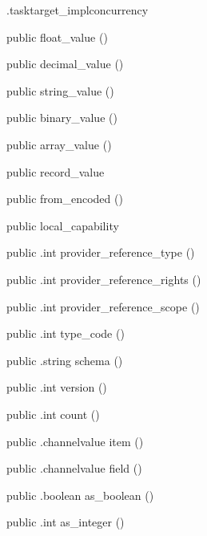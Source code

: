 \begin{CrexxClass}{.tasktarget\_impl}{concurrency}
\begin{Members}
    \Factory
      {public}
      {float\_value}
      {()}

    \Factory
      {public}
      {decimal\_value}
      {()}

    \Factory
      {public}
      {string\_value}
      {()}

    \Factory
      {public}
      {binary\_value}
      {()}

    \Factory
      {public}
      {array\_value}
      {()}

    \Factory
      {public}
      {record\_value}
      {}

    \Factory
      {public}
      {from\_encoded}
      {()}

    \Factory
      {public}
      {local\_capability}
      {}

    \Method
      {public}
      {.int}
      {provider\_reference\_type}
      {()}

    \Method
      {public}
      {.int}
      {provider\_reference\_rights}
      {()}

    \Method
      {public}
      {.int}
      {provider\_reference\_scope}
      {()}

    \Method
      {public}
      {.int}
      {type\_code}
      {()}

    \Method
      {public}
      {.string}
      {schema}
      {()}

    \Method
      {public}
      {.int}
      {version}
      {()}

    \Method
      {public}
      {.int}
      {count}
      {()}

    \Method
      {public}
      {.channelvalue}
      {item}
      {()}

    \Method
      {public}
      {.channelvalue}
      {field}
      {()}

    \Method
      {public}
      {.boolean}
      {as\_boolean}
      {()}

    \Method
      {public}
      {.int}
      {as\_integer}
      {()}


\end{Members}
\end{CrexxClass}
